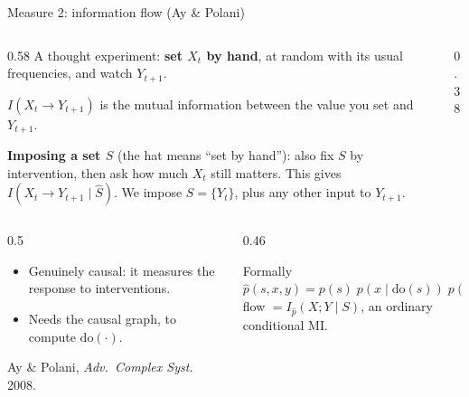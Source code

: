 \documentclass[aspectratio=169,11pt,xcolor={table}]{beamer}
\newcommand{\Xt}{X_t}
\newcommand{\Yt}{Y_t}
\newcommand{\Yn}{Y_{t+1}}
\newcommand{\cmark}{{\color{sAqua}\ding{51}}}
\newcommand{\xmark}{{\color{sOrange}\ding{55}}}
\newcommand{\aside}[1]{{\color{muted}\small #1}}
\begin{document}
\begin{frame}{Measure 2: information flow (Ay \& Polani)}
  \begin{columns}[c]
    \begin{column}{0.58\textwidth}
      A thought experiment: \textbf{set $X_t$ by hand}, at random with its usual frequencies,
      and watch $\Yn$.
      \smallskip

      $I(\Xt \to \Yn)$ is the mutual information between the value you set and $\Yn$.
      \medskip

      \textbf{Imposing a set $S$} (the hat means ``set by hand''): also fix $S$ by intervention,
      then ask how much $\Xt$ still matters. This gives $I(\Xt \to \Yn \mid \hat S)$.
      We impose $S = \{\Yt\}$, plus any other input to $\Yn$.
    \end{column}
    \begin{column}{0.38\textwidth}
      \centering
    \end{column}
  \end{columns}
  \medskip
  \begin{columns}[T]
    \begin{column}{0.5\textwidth}
      \begin{itemize}
        \item[\cmark] Genuinely causal: it measures the response to interventions.
        \item[\xmark] Needs the causal graph, to compute $\mathrm{do}(\cdot)$.
      \end{itemize}
      \aside{Ay \& Polani, \emph{Adv.\ Complex Syst.} 2008.}
    \end{column}
    \begin{column}{0.46\textwidth}
      \begin{block}{Formally}
        \small
        $\hat p(s,x,y) = p(s)\; p(x \mid \mathrm{do}(s))\; p(y \mid \mathrm{do}(s, x))$\\[1mm]
        flow $= I_{\hat p}(X; Y \mid S)$, an ordinary conditional MI.
      \end{block}
    \end{column}
  \end{columns}
\end{frame}
\end{document}
